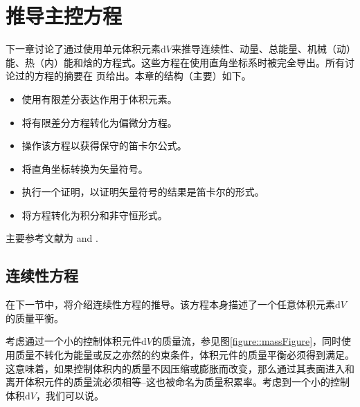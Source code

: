 \documentclass[MathematicsNumericsDerivationsAndOpenFOAM.tex]{subfiles}
\begin{document}
%
%
\chapter{推导主控方程}
%
%
%
      下一章讨论了通过使用单元体积元素d$V$来推导连续性、动量、总能量、机械（动）能、热（内）能和焓的方程式。这些方程在使用直角坐标系时被完全导出。所有讨论过的方程的摘要在 \pageref{SummationOfEquations}页给出。本章的结构（主要）如下。

%
%
\begin{itemize}
  \item 使用有限差分表达作用于体积元素。
  \item 将有限差分方程转化为偏微分方程。
  \item  操作该方程以获得保守的笛卡尔公式。
  \item 将直角坐标转换为矢量符号。
  \item 执行一个证明，以证明矢量符号的结果是笛卡尔的形式。
  \item 将方程转化为积分和非守恒形式。
\end{itemize}
%
%

	主要参考文献为
    \cite{  Bird, Versteeg, JasakPhD, Ferziger, Rappaz,  Schwarze, ProgrammersGuide}
    and \cite{Moukalled15}.
%
%
%
%
%
\section{连续性方程}
%
%
	在下一节中，将介绍连续性方程的推导。该方程本身描述了一个任意体积元素d$V$的质量平衡。

 考虑通过一个小的控制体积元件d$V$的质量流，参见图\ref{figure::massFigure}，同时使用质量不转化为能量或反之亦然的约束条件，体积元件的质量平衡必须得到满足。这意味着，如果控制体积内的质量不因压缩或膨胀而改变，那么通过其表面进入和离开体积元件的质量流必须相等--这也被命名为$\textit{质量积累率}$。考虑到一个小的控制体积d$V$，我们可以说。
\end{document}

